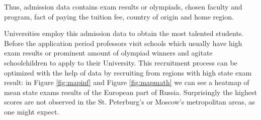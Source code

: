 \documentclass{article}
\begin{document}
Thus, admission data contains exam results or olympiads, chosen faculty and program, fact of paying the tuition fee, country of origin and home region.

Universities employ this admission data to obtain the most talented students. Before the application period professors visit schools which usually have high exam results or prominent amount of olympiad winners and agitate schoolchildren to apply to their University. This recruitment process can be optimized with the help of data by recruiting from regions with high state exam result: in Figure \ref{fig:mapinf} and Figure \ref{fig:mapmath} we can see a heatmap of mean state exams results of the European part of Russia. Surprisingly the highest scores are not observed in the St. Peterburg's or Moscow's metropolitan areas, as one might expect.
\end{document}
